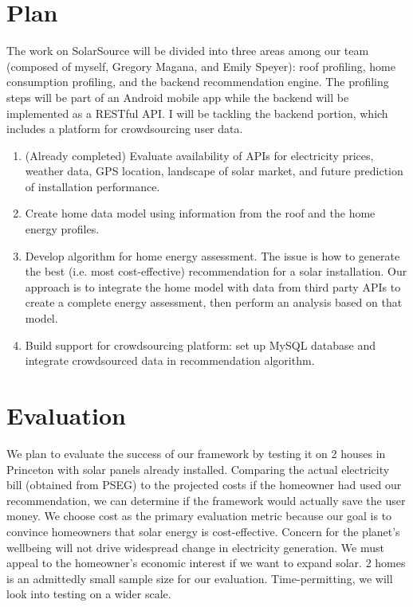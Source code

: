 \documentclass[pageno]{jpaper}
\begin{document}
\section{Plan}
The work on SolarSource will be divided into three areas among our team (composed of myself, Gregory Magana, and Emily Speyer): roof profiling, home consumption profiling, and the backend recommendation engine. The profiling steps will be part of an Android mobile app while the backend will be implemented as a RESTful API. I will be tackling the backend portion, which includes a platform for crowdsourcing user data.
\begin{enumerate}
	\item (Already completed) Evaluate availability of APIs for electricity prices, weather data, GPS location, landscape of solar market, and future prediction of installation performance.
	\item Create home data model using information from the roof and the home energy profiles.
	\item Develop algorithm for home energy assessment. The issue is how to generate the best (i.e. most cost-effective) recommendation for a solar installation. Our approach is to integrate the home model with data from third party APIs to create a complete energy assessment, then perform an analysis based on that model.
	\item Build support for crowdsourcing platform: set up MySQL database and integrate crowdsourced data in recommendation algorithm.
\end{enumerate}

\section{Evaluation}
We plan to evaluate the success of our framework by testing it on 2 houses in Princeton with solar panels already installed. Comparing the actual electricity bill (obtained from PSEG) to the projected costs if the homeowner had used our recommendation, we can determine if the framework would actually save the user money. We choose cost as the primary evaluation metric because our goal is to convince homeowners that solar energy is cost-effective. Concern for the planet's wellbeing will not drive widespread change in electricity generation. We must appeal to the homeowner's economic interest if we want to expand solar. 2 homes is an admittedly small sample size for our evaluation. Time-permitting, we will look into testing on a wider scale.



\end{document}
